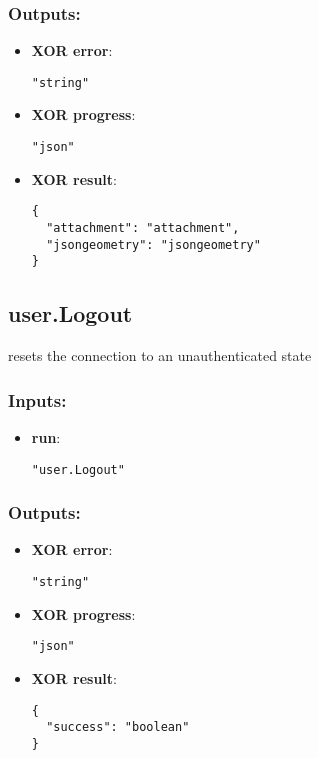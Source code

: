 \subsubsection*{Outputs:}
\begin{itemize}
    \item \textbf{XOR error}: 
\begin{lstlisting}
"string"
\end{lstlisting}
    \item \textbf{XOR progress}: 
\begin{lstlisting}
"json"
\end{lstlisting}
    \item \textbf{XOR result}: 
\begin{lstlisting}
{
  "attachment": "attachment", 
  "jsongeometry": "jsongeometry"
}
\end{lstlisting}
  \end{itemize}

\subsection{user.Logout}
resets the connection to an unauthenticated state
\subsubsection*{Inputs:}
\begin{itemize}
    \item \textbf{run}: 
\begin{lstlisting}
"user.Logout"
\end{lstlisting}
  \end{itemize}

\subsubsection*{Outputs:}
\begin{itemize}
    \item \textbf{XOR error}: 
\begin{lstlisting}
"string"
\end{lstlisting}
    \item \textbf{XOR progress}: 
\begin{lstlisting}
"json"
\end{lstlisting}
    \item \textbf{XOR result}: 
\begin{lstlisting}
{
  "success": "boolean"
}
\end{lstlisting}
  \end{itemize}

